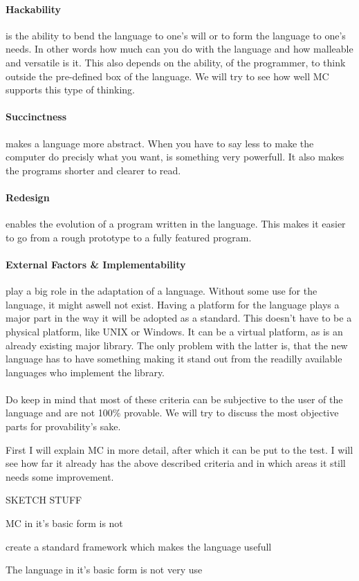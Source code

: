 \begin{multicols}{2}
\paragraph{Hackability}
is the ability to bend the language to one's will or to form the language to one's needs. In other words how much can you do with the language and how malleable and versatile is it. This also depends on the ability, of the programmer, to think outside the pre-defined box of the language. We will try to see how well MC supports this type of thinking.

\paragraph{Succinctness}
makes a language more abstract. When you have to say less to make the computer do precisly what you want, is something very powerfull. It also makes the programs shorter and clearer to read.

\paragraph{Redesign}
enables the evolution of a program written in the language. This makes it easier to go from a rough prototype to a fully featured program.

\paragraph{External Factors & Implementability}
play a big role in the adaptation of a language. Without some use for the language, it might aswell not exist. Having a platform for the language plays a major part in the way it will be adopted as a standard. This doesn't have to be a physical platform, like UNIX or Windows. It can be a virtual platform, as is an already existing major library. The only problem with the latter is, that the new language has to have something making it stand out from the readilly available languages who implement the library.

\paragraph{}
Do keep in mind that most of these criteria can be subjective to the user of the language and are not 100\% provable. We will try to discuss the most objective parts for provability's sake.

First I will explain MC in more detail, after which it can be put to the test. I will see how far it already has the above described criteria and in which areas it still needs some improvement.

SKETCH STUFF

MC in it's basic form is not

create a standard framework which makes the language usefull

The language in it's basic form is not very use

\end{multicols}
